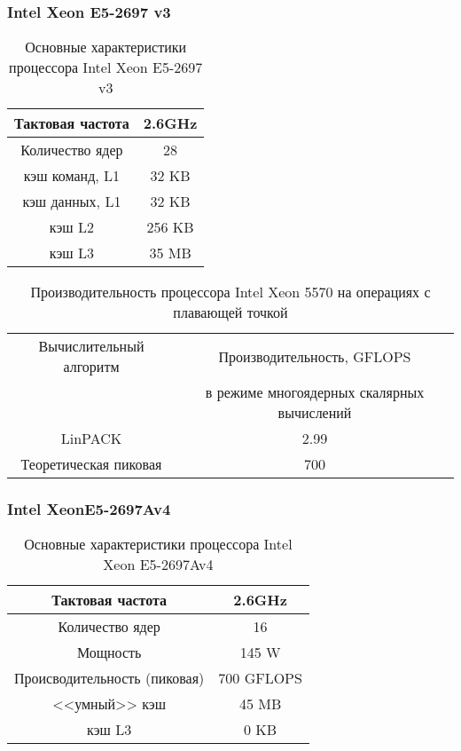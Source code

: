 \subsubsection{Intel Xeon E5-2697 v3}
\begin{table}[ht]
	\begin{center}
		\caption{Основные характеристики процессора Intel Xeon  E5-2697 v3}
		\begin{tabular}{|c|c|}
			\hline	
			Тактовая частота & 2.6GHz   \\ \hline
			Количество ядер & 28 	    \\ \hline
			кэш команд, L1 &  32 KB     \\ \hline
			кэш данных, L1 &  32 KB     \\ \hline
			кэш L2         &  256 KB    \\ \hline
			кэш L3         &  35 MB     \\ \hline
		\end{tabular}
	\end{center} 	
\end{table} 	

\begin{table}[ht]
	\begin{center}
		\caption{Производительность процессора Intel Xeon  5570 на операциях с плавающей точкой}
		\begin{tabular}{|c|c|}
			\hline	
			Вычислительный алгоритм &  Производительность, GFLOPS \\ 
			& в режиме многоядерных скалярных вычислений \\ \hline
		    LinPACK  &  2.99 	\\ \hline
			Теоретическая пиковая &  700   \\ \hline
		\end{tabular}
	\end{center} 	
\end{table} 	

\subsubsection{Intel XeonE5-2697Av4}

\begin{table}[ht]
	\begin{center}
		\caption{Основные характеристики процессора Intel Xeon  E5-2697Av4}
		\begin{tabular}{|c|c|}
			\hline	
			Тактовая частота & 2.6GHz   \\ \hline
			Количество ядер & 16 	     \\ \hline
			Мощность        &  145 W      \\ \hline
			Происводительность (пиковая) &  700 GFLOPS       \\ \hline
			<<умный>> кэш   &  45 MB      \\ \hline
			кэш L3          &  0 KB        \\ \hline
		\end{tabular}
	\end{center} 	
\end{table} 	





